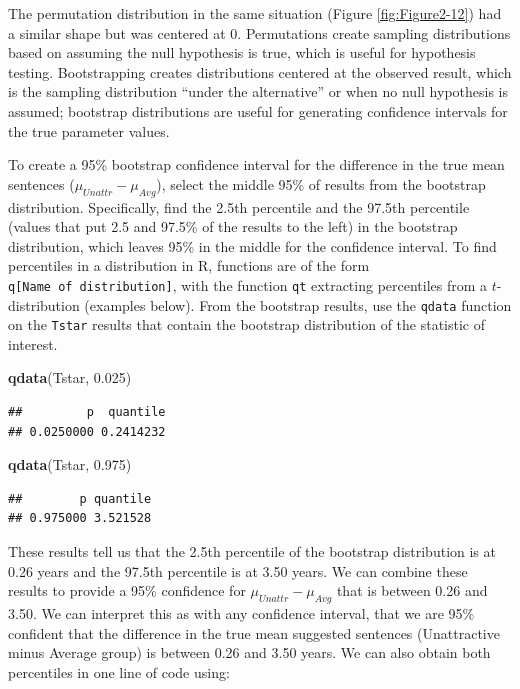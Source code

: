 \documentclass[]{book}
\newenvironment{Shaded}{\begin{snugshade}}{\end{snugshade}}
\newcommand{\KeywordTok}[1]{\textcolor[rgb]{0.13,0.29,0.53}{\textbf{#1}}}
\newcommand{\FloatTok}[1]{\textcolor[rgb]{0.00,0.00,0.81}{#1}}
\newcommand{\NormalTok}[1]{#1}
\theoremstyle{definition}
\theoremstyle{definition}
\theoremstyle{remark}
\begin{document}
The permutation distribution in the same situation (Figure
\ref{fig:Figure2-12}) had a similar shape but was centered at 0.
Permutations create sampling distributions based on assuming the null
hypothesis is true, which is useful for hypothesis testing.
Bootstrapping creates distributions centered at the observed result,
which is the sampling distribution ``under the alternative'' or when no
null hypothesis is assumed; bootstrap distributions are useful for
generating confidence intervals for the true parameter values.

To create a 95\% bootstrap confidence interval for the difference in the
true mean sentences (\(\mu_{Unattr}-\mu_{Avg}\)), select the middle 95\%
of results from the bootstrap distribution. Specifically, find the 2.5th
percentile and the 97.5th percentile (values that put 2.5 and 97.5\% of
the results to the left) in the bootstrap distribution, which leaves
95\% in the middle for the confidence interval. To find percentiles in a
distribution in R, functions are of the form
\texttt{q{[}Name\ of\ distribution{]}}, with the function \texttt{qt}
extracting percentiles from a \(t\)-distribution (examples below). From
the bootstrap results, use the \texttt{qdata} function on the
\texttt{Tstar} results that contain the bootstrap distribution of the
statistic of interest.

\begin{Shaded}
\begin{Highlighting}[]
\KeywordTok{qdata}\NormalTok{(Tstar, }\FloatTok{0.025}\NormalTok{)}
\end{Highlighting}
\end{Shaded}

\begin{verbatim}
##         p  quantile 
## 0.0250000 0.2414232
\end{verbatim}

\begin{Shaded}
\begin{Highlighting}[]
\KeywordTok{qdata}\NormalTok{(Tstar, }\FloatTok{0.975}\NormalTok{)}
\end{Highlighting}
\end{Shaded}

\begin{verbatim}
##        p quantile 
## 0.975000 3.521528
\end{verbatim}

These results tell us that the 2.5th percentile of the bootstrap
distribution is at 0.26 years and the 97.5th percentile is at 3.50
years. We can combine these results to provide a 95\% confidence for
\(\mu_{Unattr}-\mu_{Avg}\) that is between 0.26 and 3.50. We can
interpret this as with any confidence interval, that we are 95\%
confident that the difference in the true mean suggested sentences
(Unattractive minus Average group) is between 0.26 and 3.50 years. We
can also obtain both percentiles in one line of code using:
\end{document}
